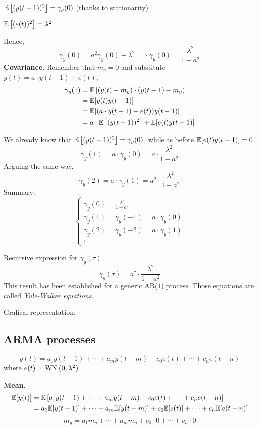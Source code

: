 $\mathbb{E}\left[(y(t-1))^{2}\right]=\gamma_{y}(0)$ (thanks to stationarity)

$\mathbb{E}\left[(e(t))^{2}\right]=\lambda^{2}$

Hence,
\[
	\gamma_{y}(0)=a^{2} \gamma_{y}(0)+\lambda^{2} \implies \gamma_{y}(0)=\frac{\lambda^{2}}{1-a^{2}}
\]
\textbf{Covariance.}
Remember that $m_{y}=0$ and substitute $y(t)=a \cdot y(t-1)+e(t)$,
\begin{align*}
	\gamma_{y}(1)&=\mathbb{E}\left[\left(y(t)-m_{y}\right) \cdot\left(y(t-1)-m_{y}\right)\right]\\
	&=\mathbb{E}[y(t) y(t-1)]\\
	&=\mathbb{E}[(a \cdot y(t-1)+e(t))y(t-1)]\\
	&=a \cdot \mathbb{E}\left[(y(t-1))^{2}\right]+\mathbb{E}[e(t) y(t-1)]
\end{align*}

We already know that $\mathbb{E}\left[(y(t-1))^{2}\right]=\gamma_{y}(0)$, while as before $\mathbb{E}[e(t) y(t-1)]=0$.
$$
\gamma_{y}(1)=a \cdot \gamma_{y}(0)=a \cdot \frac{\lambda^{2}}{1-a^{2}}
$$
Arguing the same way,
\[
	\gamma_{y}(2)=a \cdot \gamma_{y}(1)=a^{2} \cdot \frac{\lambda^{2}}{1-a^{2}}
\]
Summary:
\begin{equation*}
	\boxed{
		\begin{cases}
			\gamma_{y}(0)=\frac{\lambda^{2}}{1-a^{2}} \\
			\gamma_{y}(1)=\gamma_{y}(-1)=a \cdot \gamma_{y}(0) \\
			\gamma_{y}(2)=\gamma_{y}(-2)=a \cdot \gamma_{y}(1) \\
			\vdots
		\end{cases}
	}
\end{equation*}

Recursive expression for $\gamma_{y}(\tau)$
$$
	\gamma_{y}(\tau)=a^{\tau} \cdot \frac{\lambda^{2}}{1-a^{2}}
$$
This result has been established for a generic AR($1$) process.
Those equations are called \emph{Yule-Walker equations}.

Grafical representation:



\subsection{ARMA processes}
$$
y(t)=a_{1} y(t-1)+\cdots+a_{m} y(t-m)+c_{0} e(t)+\cdots+c_{n} e(t-n)
$$
where $e(t) \sim \operatorname{WN}\left(0, \lambda^{2}\right)$.

\textbf{Mean.}
\begin{align*}
	\mathbb{E}[y(t)] &=\mathbb{E}\left[a_{1} y(t-1)+\cdots+a_{m} y(t-m)+c_{0} e(t)+\cdots+c_{n} e(t-n)\right] \\
	&=a_{1} \mathbb{E}[y(t-1)]+\cdots+a_{m} \mathbb{E}[y(t-m)]+c_{0} \mathbb{E}[e(t)]+\cdots+c_{n} \mathbb{E}[e(t-n)]
\end{align*}
$$
m_{y}=a_{1} m_{y}+\cdots+a_{m} m_{y}+c_{0} \cdot 0+\cdots+c_{n} \cdot 0
$$

